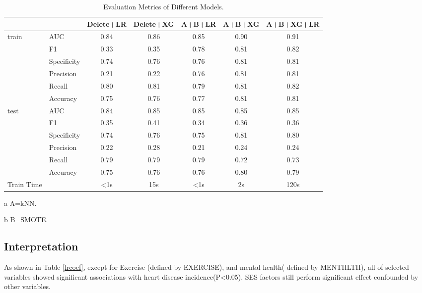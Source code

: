 \documentclass[11pt]{article}
\begin{document}
\begin{table}[htb]
    \centering
    \caption{Evaluation Metrics of Different Models.}
    \label{eval}
    \begin{tabular}{llccccc}
        \hline
        ~ & ~ & Delete+LR & Delete+XG & A\tnote{a}+B\tnote{b}+LR & A+B+XG & A+B+XG+LR  \\ 
        \hline
        train & AUC & 0.84 & 0.86 & 0.85 & 0.90 & 0.91  \\ 
        ~ & F1 & 0.33 & 0.35 & 0.78 & 0.81 & 0.82  \\ 
        ~ & Specificity & 0.74 & 0.76 & 0.76 & 0.81 & 0.81  \\ 
        ~ & Precision & 0.21 & 0.22 & 0.76 & 0.81 & 0.81  \\ 
        ~ & Recall & 0.80 & 0.81 & 0.79 & 0.81 & 0.82  \\ 
        ~ & Accuracy & 0.75 & 0.76 & 0.77 & 0.81 & 0.81  \\ 
        \hline
        test & AUC & 0.84 & 0.85 & 0.85 & 0.85 & 0.85  \\ 
        ~ & F1 & 0.35 & 0.41 & 0.34 & 0.36 & 0.36  \\ 
        ~ & Specificity & 0.74 & 0.76 & 0.75 & 0.81 & 0.80  \\ 
        ~ & Precision & 0.22 & 0.28 & 0.21 & 0.24 & 0.24  \\ 
        ~ & Recall & 0.79 & 0.79 & 0.79 & 0.72 & 0.73  \\ 
        ~ & Accuracy & 0.75 & 0.76 & 0.76 & 0.80 & 0.79  \\ 
        \hline
        Train Time & ~ & <1s & 15s & <1s & 2s & 120s  \\ 
        \hline
    \end{tabular}
    \begin{tablenotes}
    \footnotesize
    \item[a] A=kNN.
    \item[b] B=SMOTE.
    \end{tablenotes}
\end{table}


\subsection{Interpretation}
As shown in Table \ref{lrcoef}, except for Exercise (defined by EXERCISE), and mental health( defined by MENTHLTH), all of selected variables showed significant associations with heart disease incidence(P<0.05). SES factors still perform significant effect confounded by other variables. 
\end{document}
